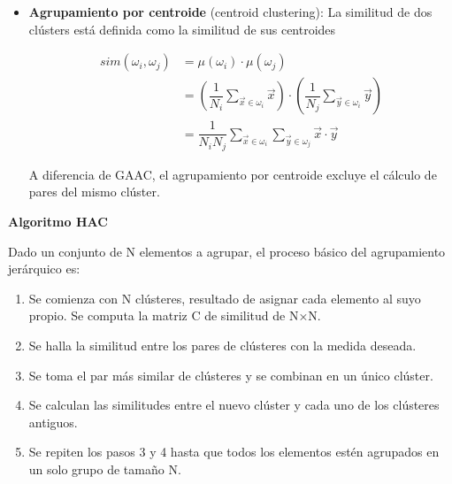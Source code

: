\documentclass{llncs}
\begin{document}
\begin{itemize}
	\vspace{1em}
	\item \textbf{Agrupamiento por centroide} (centroid clustering): La similitud de dos cl\'usters est\'a definida como la similitud de sus centroides

		\begin{align}
			sim(\omega_{i}, \omega_{j}) &= \mu(\omega_{i})\cdot\mu(\omega_{j}) \nonumber\\
			&= \left(\dfrac{1}{N_{i}}\sum_{\overrightarrow{x} \in \omega_{i}}\overrightarrow{x}\right) \cdot \left(\dfrac{1}{N_{j}}\sum_{\overrightarrow{y} \in \omega_{i}}\overrightarrow{y}\right) \nonumber\\
			& = \dfrac{1}{N_{i}N_{j}} \sum_{\overrightarrow{x} \in \omega_{i}}\sum_{\overrightarrow{y} \in \omega_{j}}\overrightarrow{x}\cdot\overrightarrow{y} \nonumber
		\end{align}
	
	A diferencia de GAAC, el agrupamiento por centroide excluye el c\'alculo de pares del mismo cl\'uster.
\end{itemize}

\vspace{1em}
\textbf{Algoritmo HAC}

Dado un conjunto de N elementos a agrupar, el proceso básico del agrupamiento jerárquico es:
\begin{enumerate}
	\item Se comienza con N cl\'usteres, resultado de asignar cada elemento al suyo propio. Se computa la matriz C de similitud de N×N.
	
	\item Se halla la similitud entre los pares de cl\'usteres con la medida deseada.
	
	\item Se toma el par más similar de clústeres y se combinan en un único clúster.
	
	\item Se calculan las similitudes entre el nuevo clúster y cada uno de los cl\'usteres antiguos.
	
	\item Se repiten los pasos 3 y 4 hasta que todos los elementos estén agrupados en un solo grupo de tamaño N.
\end{enumerate}
\end{document}

